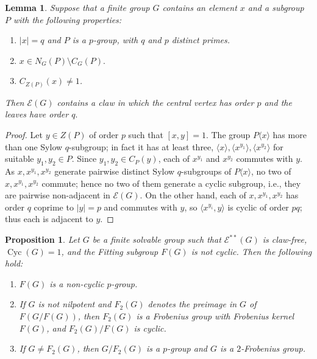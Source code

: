 \documentclass[preprint,11pt]{elsarticle}
\newcommand{\cyc}{\operatorname{Cyc}}
\newtheorem{lemma}[theorem]{\bf Lemma}
\newtheorem{proposition}[theorem]{\bf Proposition}
\begin{document}
\begin{lemma}\label{frobcent}
	Suppose that a finite group $G$ contains an element $x$ and a subgroup $P$ 
	with the following properties:
	\begin{enumerate}
		\item $|x|=q$ and $P$ is a $p$-group, with $q$ and $p$ distinct primes.
		\item $x\in N_G(P)\setminus C_G(P).$
		\item $C_{Z(P)}(x)\neq 1$.
	\end{enumerate}
	Then $\mathcal{E}(G)$ contains a claw in which the central vertex has order $p$ 
	and the leaves have order $q.$
\end{lemma}
\begin{proof}
	Let $y \in Z(P)$ of order $p$ such that $[x, y] = 1$.
	The group $P\langle x \rangle$ has more than one Sylow $q$-subgroup; in fact 
	it has at least three,
	$\langle x \rangle, \langle x^{y_1} \rangle, \langle x^{y_2} \rangle$
	for suitable $y_1, y_2 \in P$.
	Since $y_1, y_2 \in C_P(y)$, each of $x^{y_1}$ and $x^{y_2}$ 
	commutes with $y$.
	As $x, x^{y_1}, x^{y_2}$ generate pairwise 
	distinct Sylow $q$-subgroups of $P\langle x \rangle$, no two of 
	$x, x^{y_1}, x^{y_2}$ commute; hence no two of them generate a cyclic 
	subgroup, i.e., they are pairwise non-adjacent in $\mathcal{E}(G)$. 
	On the other hand, each of $x, x^{y_1}, x^{y_2}$ has order $q$ coprime 
	to $|y| = p$ and commutes with $y$, so $\langle x^{y_i}, y \rangle$ 
	is cyclic of order $pq$; thus each is adjacent to $y$.
\end{proof}

\begin{proposition}\label{solv-2-Frb-G-trival-dom}
	Let $G$ be a finite solvable group such that $\mathcal{E}^{**}(G)$ 
	is claw-free, $\cyc(G) = 1$, and the Fitting subgroup $F(G)$ 
	is not cyclic. Then the following hold:
	\begin{enumerate}
		\item $F(G)$ is a non-cyclic $p$-group.
		\item If $G$ is not nilpotent and $F_2(G)$ denotes the preimage 
		in $G$ of $F(G/F(G))$, then $F_2(G)$ is a Frobenius group with 
		Frobenius kernel $F(G)$, and $F_2(G)/F(G)$ is cyclic.
		\item If $G \neq F_2(G)$, then $G/F_2(G)$ is a $p$-group and 
		$G$ is a $2$-Frobenius group.
	\end{enumerate}
\end{proposition}
\end{document}
